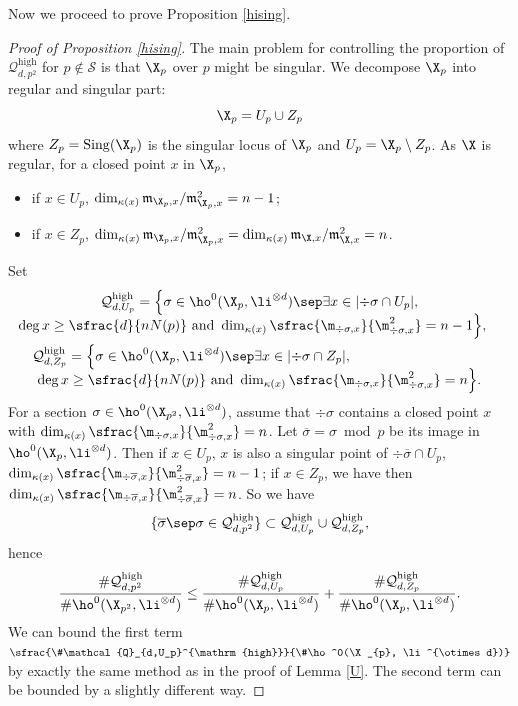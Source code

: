 Now we proceed to prove Proposition \ref{hising}.
\begin{proof}[Proof of Proposition \ref{hising}]
The main problem for controlling the proportion of $\mathcal{Q}_{d,p^2}^{\mathrm{high}}$ for $p\not\in \mathcal{S}$ is that $\X_{p}$ over $p$ might be singular. We decompose $\X_p$ into regular and singular part:\vspace*{-3pt}
\[
\X_p=U_p\cup Z_p
\]
where $Z_p=\mathrm{Sing}(\X_p)$ is the singular locus of $\X_p$ and $U_p=\X_p\setminus Z_p$. As $\X$ is regular, for a closed point $x$ in $\X_p$,
\begin{itemize}
\item
if $x\in U_p$, $\dim_{\kappa(x)}\mathfrak{m}_{\X_p, x}/\mathfrak{m}^2_{\X_p, x}=n-1$;
\item
if $x\in Z_p$, $\dim_{\kappa(x)}\mathfrak{m}_{\X_p, x}/\mathfrak{m}^2_{\X_p, x}=\dim_{\kappa(x)}\mathfrak{m}_{\X, x}/\mathfrak{m}^2_{\X, x}=n$.
\end{itemize}
Set\vspace*{-3pt}
\begin{multline*}
\mathcal{Q}_{d,U_p}^{\mathrm{high}}= \Bigl\{ \sigma\in \ho^0(\X_{p}, \li^{\otimes d})\sep \exists x\in |{\div\sigma\cap U_p}|,\\[-5pt]
\shoveright{\deg x\geq \sfrac{d}{nN(p)}\text{ and } \dim_{\kappa(x)}\sfrac{\m_{\div \sigma,x}}{\m^2_{\div \sigma, x}}=n-1 \Bigr\},}\\
\shoveleft{\mathcal{Q}_{d,Z_p}^{\mathrm{high}}= \Bigl\{ \sigma\in \ho^0(\X_{p}, \li^{\otimes d})\sep \exists x\in |{\div\sigma\cap Z_p}|,}\\[-5pt]
\deg x\geq \sfrac{d}{nN(p)}\text{ and } \dim_{\kappa(x)}\sfrac{\m_{\div \sigma,x}}{\m^2_{\div \sigma, x}}=n \Bigr\}.
\end{multline*}
For a section $\sigma\in \ho^0(\X_{p^2}, \li^{\otimes d})$, assume that $\div \sigma$ contains a closed point $x$ with $\dim_{\kappa(x)}\sfrac{\m_{\div \sigma,x}}{\m^2_{\div \sigma, x}}=n$. Let $\overline{\sigma}=\sigma \bmod p$ be its image in $\ho^0(\X_{p}, \li^{\otimes d})$. Then if $x\in U_p$, $x$ is also a singular point of $\div \overline{\sigma}\cap U_p$, \ie $\dim_{\kappa(x)}\sfrac{\m_{\div \overline{\sigma},x}}{\m^2_{\div \overline{\sigma}, x}}=n-1$; if $x\in Z_p$, we have then $\dim_{\kappa(x)}\sfrac{\m_{\div \overline{\sigma},x}}{\m^2_{\div \overline{\sigma}, x}}=n$. So we have
\[
\{ \overline{\sigma}\sep \sigma \in \mathcal{Q}_{d,p^2}^{\mathrm{high}} \}\subset \mathcal{Q}_{d,U_p}^{\mathrm{high}}\cup \mathcal{Q}_{d,Z_p}^{\mathrm{high}},
\]
hence\vspace*{-3pt}
\[
\frac{\#\mathcal{Q}_{d,p^2}^{\mathrm{high}}}{\#\ho^0(\X_{p^2}, \li^{\otimes d})}\leq \frac{\#\mathcal{Q}_{d,U_p}^{\mathrm{high}}}{\#\ho^0(\X_{p}, \li^{\otimes d})}+\frac{\#\mathcal{Q}_{d,Z_p}^{\mathrm{high}}}{\#\ho^0(\X_{p}, \li^{\otimes d})}.
\]
We can bound the first term $\sfrac{\#\mathcal{Q}_{d,U_p}^{\mathrm{high}}}{\#\ho^0(\X_{p}, \li^{\otimes d})}$ by exactly the same method as in the proof of Lemma \ref{U}. The second term can be bounded by a slightly different way.


\end{proof}
